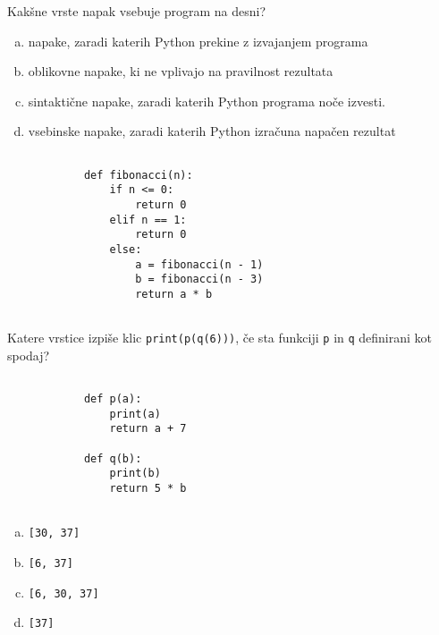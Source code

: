 \documentclass[arhiv, 10pt]{../izpit}
\newcommand{\inlinepy}[1]{\texttt{#1}}
\begin{document}
        \naloga*
        \begin{multicols}{2}
        \noindent
        Kakšne vrste napak vsebuje program na desni?

        \begin{enumerate}[(a)]
\item napake, zaradi katerih Python prekine z izvajanjem programa
\item oblikovne napake, ki ne vplivajo na pravilnost rezultata
\item sintaktične napake, zaradi katerih Python programa noče izvesti.
\item vsebinske napake, zaradi katerih Python izračuna napačen rezultat
\end{enumerate}

        \columnbreak

        \begin{verbatim}
        
            def fibonacci(n):
                if n <= 0:
                    return 0
                elif n == 1:
                    return 0
                else:
                    a = fibonacci(n - 1)
                    b = fibonacci(n - 3)
                    return a * b
            
        \end{verbatim}

        \end{multicols}

    
        \naloga*
        Katere vrstice izpiše klic \inlinepy{print(p(q(6)))}, če sta funkciji \inlinepy{p} in \inlinepy{q} definirani kot spodaj?

        \begin{multicols}{2}
        \begin{verbatim}
        
            def p(a):
                print(a)
                return a + 7

            def q(b):
                print(b)
                return 5 * b
        
        \end{verbatim}

        \begin{enumerate}[(a)]
\item \inlinepy{[30, 37]}
\item \inlinepy{[6, 37]}
\item \inlinepy{[6, 30, 37]}
\item \inlinepy{[37]}
\end{enumerate}

        \end{multicols}
    
\end{document}
